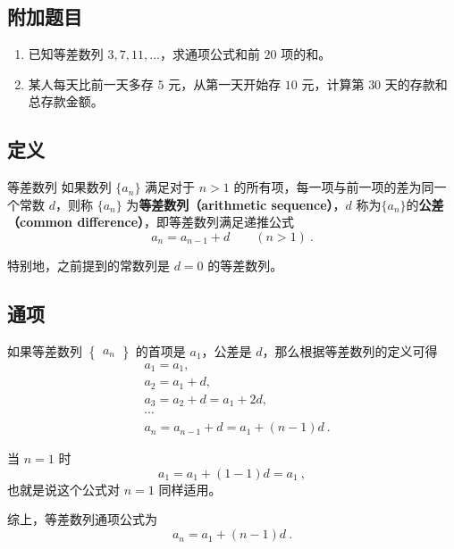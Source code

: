 \subsection*{附加题目}

\begin{enumerate}
    \item 已知等差数列 $3, 7, 11, \dots$，求通项公式和前 $20$ 项的和。
    \item 某人每天比前一天多存 $5$ 元，从第一天开始存 $10$ 元，计算第 $30$ 天的存款和总存款金额。
\end{enumerate}


\subsection{定义}

\begin{definition}{等差数列}
如果数列 $\{a_n\}$ 满足对于 $n > 1$ 的所有项，每一项与前一项的差为同一个常数 $d$，则称 $\{a_n\}$ 为\textbf{等差数列（arithmetic sequence）}，$d$ 称为$\{a_n\}$的\textbf{公差（common difference）}，即等差数列满足递推公式
\begin{equation}
a_{n}=a_{n-1}+d\qquad(n>1)~.
\end{equation}
\end{definition}

特别地，之前提到的常数列是 $d = 0$ 的等差数列。

\subsection{通项}
如果等差数列 $\begin{Bmatrix} a_n \end{Bmatrix}$ 的首项是 $a_1$，公差是 $d$，那么根据等差数列的定义可得
\begin{equation}
\begin{aligned}
&a_1 = a_1,\\
&a_2 = a_1 + d,\\
&a_3 = a_2 + d = a_1 + 2d,\\
&\cdots \\
&a_n = a_{n-1} + d = a_1 + (n - 1)d~.
\end{aligned}
\end{equation}

当 $n = 1$ 时
\begin{equation}
a_1 = a_1 + (1 - 1)d = a_1~,
\end{equation}
也就是说这个公式对 $n = 1$ 同样适用。

综上，等差数列通项公式为
\begin{equation}
a_n = a_1 + (n - 1)d~.
\end{equation}

